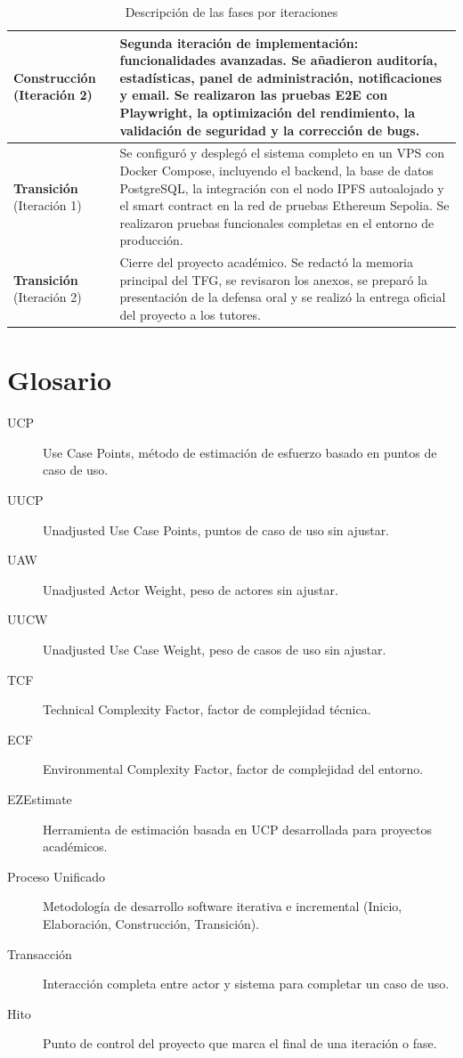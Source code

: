 \documentclass[11pt, a4paper]{article}
\begin{document}
\begin{table}[H]
\begin{tabular}{|p{4cm}|p{10cm}|}
\hline
\textbf{Construcción} (Iteración 2) &
Segunda iteración de implementación: funcionalidades avanzadas. Se añadieron auditoría, estadísticas, panel de administración, notificaciones y email. Se realizaron las pruebas E2E con Playwright, la optimización del rendimiento, la validación de seguridad y la corrección de bugs. \\
\hline
\textbf{Transición} (Iteración 1) &
Se configuró y desplegó el sistema completo en un VPS con Docker Compose, incluyendo el backend, la base de datos PostgreSQL, la integración con el nodo IPFS autoalojado y el smart contract en la red de pruebas Ethereum Sepolia. Se realizaron pruebas funcionales completas en el entorno de producción. \\
\hline
\textbf{Transición} (Iteración 2) &
Cierre del proyecto académico. Se redactó la memoria principal del TFG, se revisaron los anexos, se preparó la presentación de la defensa oral y se realizó la entrega oficial del proyecto a los tutores. \\
\hline
\end{tabular}
\caption{Descripción de las fases por iteraciones}\label{tab:fases-descripcion}
\end{table}

\section{Glosario}

\begin{description}
    \item[UCP] Use Case Points, método de estimación de esfuerzo basado en puntos de caso de uso.
    \item[UUCP] Unadjusted Use Case Points, puntos de caso de uso sin ajustar.
    \item[UAW] Unadjusted Actor Weight, peso de actores sin ajustar.
    \item[UUCW] Unadjusted Use Case Weight, peso de casos de uso sin ajustar.
    \item[TCF] Technical Complexity Factor, factor de complejidad técnica.
    \item[ECF] Environmental Complexity Factor, factor de complejidad del entorno.
    \item[EZEstimate] Herramienta de estimación basada en UCP desarrollada para proyectos académicos.
    \item[Proceso Unificado] Metodología de desarrollo software iterativa e incremental (Inicio, Elaboración, Construcción, Transición).
    \item[Transacción] Interacción completa entre actor y sistema para completar un caso de uso.
    \item[Hito] Punto de control del proyecto que marca el final de una iteración o fase.
\end{description}
\end{document}
